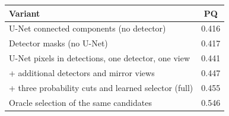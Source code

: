     \begin{tabular}{lc}
        \toprule
        Variant & PQ \\
        \midrule
        U-Net connected components (no detector) & 0.416 \\
        Detector masks (no U-Net) & 0.417 \\
        U-Net pixels in detections, one detector, one view & 0.441 \\
        \quad + additional detectors and mirror views & 0.447 \\
        \quad + three probability cuts and learned selector (full) & 0.455 \\
        Oracle selection of the same candidates & 0.546 \\
        \bottomrule
    \end{tabular}
